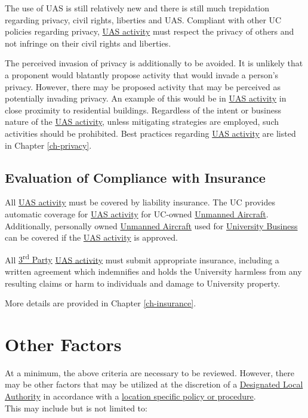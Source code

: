 \documentclass[
]{book}
\begin{document}
The use of UAS is still relatively new and there is still much trepidation regarding privacy, civil rights, liberties and UAS. Compliant with other UC policies regarding privacy, \protect\hyperlink{UASactivity}{UAS activity} must respect the privacy of others and not infringe on their civil rights and liberties.

The perceived invasion of privacy is additionally to be avoided. It is unlikely that a proponent would blatantly propose activity that would invade a person's privacy. However, there may be proposed activity that may be perceived as potentially invading privacy. An example of this would be in \protect\hyperlink{UASactivity}{UAS activity} in close proximity to residential buildings. Regardless of the intent or business nature of the \protect\hyperlink{UASactivity}{UAS activity}, unless mitigating strategies are employed, such activities should be prohibited. Best practices regarding \protect\hyperlink{UASactivity}{UAS activity} are listed in Chapter \ref{ch-privacy}.

\hypertarget{ss-insrnc}{%
\subsection{Evaluation of Compliance with Insurance}\label{ss-insrnc}}

All \protect\hyperlink{UASactivity}{UAS activity} must be covered by liability insurance. The UC provides automatic coverage for \protect\hyperlink{UASactivity}{UAS activity} for UC-owned \protect\hyperlink{UA}{Unmanned Aircraft}. Additionally, personally owned \protect\hyperlink{UA}{Unmanned Aircraft} used for \protect\hyperlink{UB}{University Business} can be covered if the \protect\hyperlink{UASactivity}{UAS activity} is approved.

All \protect\hyperlink{rdparty}{3\textsuperscript{rd} Party} \protect\hyperlink{UASactivity}{UAS activity} must submit appropriate insurance, including a written agreement which indemnifies and holds the University harmless from any resulting claims or harm to individuals and damage to University property.

More details are provided in Chapter \ref{ch-insurance}.

\hypertarget{s-factors}{%
\section{Other Factors}\label{s-factors}}

At a minimum, the above criteria are necessary to be reviewed. However, there may be other factors that may be utilized at the discretion of a \protect\hyperlink{DLA}{Designated Local Authority} in accordance with a \protect\hyperlink{LSP}{location specific policy or procedure}.\\
This may include but is not limited to:
\end{document}

